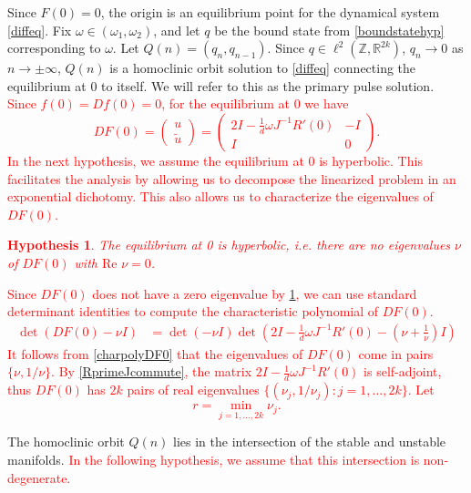 \documentclass[12pt]{elsarticle}
\def\R{{\mathbb R}}
\def\Z{{\mathbb Z}}
\newtheorem{hypothesis}{Hypothesis}
\newcommand{\revised}[1]{ \textcolor{red}{#1} }
\begin{document}
Since $F(0) = 0$, the origin is an equilibrium point for the dynamical system \cref{diffeq}. Fix $\omega \in (\omega_1, \omega_2)$, and let $q$ be the bound state from \cref{boundstatehyp} corresponding to $\omega$. Let $Q(n) = ( q_n, q_{n-1} )$. Since $q \in \ell^2(\Z, \R^{2k})$, $q_n \rightarrow 0$ as $n \rightarrow \pm \infty$, $Q(n)$ is a homoclinic orbit solution to \cref{diffeq} connecting the equilibrium at 0 to itself. We will refer to this as the primary pulse solution. \revised{Since $f(0) = Df(0) = 0$, for the equilibrium at 0 we have
\begin{equation}\label{DF0}
DF(0) = \begin{pmatrix}u \\ \tilde{u} \end{pmatrix} =
\begin{pmatrix}
2I - \frac{1}{d}\omega J^{-1} R'(0) & -I  \\
I & 0
\end{pmatrix}.
\end{equation}
}
\revised{In the next hypothesis, we assume the equilibrium at 0 is hyperbolic. This facilitates the analysis by allowing us to decompose the linearized problem in an exponential dichotomy. This also allows us to characterize the eigenvalues of $DF(0)$.}
\revised{
\begin{hypothesis}\label{hyperbolichyp}
The equilibrium at 0 is hyperbolic, i.e. there are no eigenvalues $\nu$ of $DF(0)$ with $\text{Re } \nu = 0$. 
\end{hypothesis}
Since $DF(0)$ does not have a zero eigenvalue by \cref{hyperbolichyp}, we can use standard determinant identities to compute the characteristic polynomial of $DF(0)$.
\begin{align}\label{charpolyDF0}
\det(DF(0) - \nu I) &= 
\det(-\nu I) \det \left( 2I - \frac{1}{d}\omega J^{-1} R'(0) - \left( \nu + \frac{1}{\nu} \right) I\right)
\end{align}
It follows from \eqref{charpolyDF0} that the eigenvalues of $DF(0)$ come in pairs $\{\nu, 1/\nu\}$. By \eqref{RprimeJcommute}, the matrix $2I - \frac{1}{d}\omega J^{-1} R'(0)$ is self-adjoint, thus $DF(0)$ has $2k$ pairs of real eigenvalues $\{ (\nu_j, 1/\nu_j) : j = 1, \dots, 2k\}$. Let
\begin{equation}\label{defr}
r = \min_{j = 1, \dots, 2k} \nu_j.
\end{equation}
}
The homoclinic orbit $Q(n)$ lies in the intersection of the stable and unstable manifolds. \revised{In the following hypothesis, we assume that this intersection is non-degenerate.}
\end{document}
